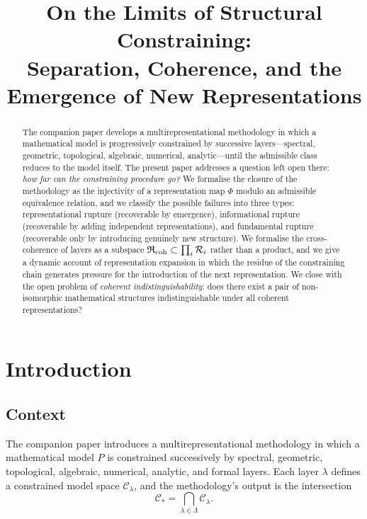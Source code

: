 \documentclass[11pt,a4paper]{article}
\title{%
  \textbf{On the Limits of Structural Constraining:}\\[4pt]
  \large Separation, Coherence, and the Emergence of New Representations
}
\author{}
\date{}
\theoremstyle{definition}
\theoremstyle{plain}
\newcommand{\Lam}{\Lambda}
\newcommand{\Rcal}{\mathcal{R}}
\newcommand{\Ccal}{\mathcal{C}}
\newcommand{\Rfrak}{\mathfrak{R}}
\newcommand{\Phimap}{\Phi}
\begin{document}
\maketitle

\begin{abstract}
\noindent
The companion paper \cite{paperI} develops a
multirepresentational methodology in which a mathematical model is
progressively constrained by successive layers---spectral,
geometric, topological, algebraic, numerical, analytic---until the
admissible class reduces to the model itself. The present paper
addresses a question left open there: \emph{how far can the
constraining procedure go?} We formalise the closure of the
methodology as the injectivity of a representation map $\Phimap$
modulo an admissible equivalence relation, and we classify the
possible failures into three types: representational rupture
(recoverable by emergence), informational rupture (recoverable by
adding independent representations), and fundamental rupture
(recoverable only by introducing genuinely new structure). We
formalise the cross-coherence of layers as a subspace $\Rfrak_{\rm
coh} \subset \prod_i \Rcal_i$ rather than a product, and we give a
dynamic account of representation expansion in which the residue of
the constraining chain generates pressure for the introduction of
the next representation. We close with the open problem of
\emph{coherent indistinguishability}: does there exist a pair of
non-isomorphic mathematical structures indistinguishable under all
coherent representations?
\end{abstract}

\tableofcontents

\section{Introduction}
\label{sec:intro}

\subsection{Context}

The companion paper \cite{paperI} introduces a multirepresentational
methodology in which a mathematical model $P$ is constrained
successively by spectral, geometric, topological, algebraic,
numerical, analytic, and formal layers. Each layer $\lambda$ defines
a constrained model space $\Ccal_\lambda$, and the methodology's
output is the intersection
\[
  \Ccal_\ast = \bigcap_{\lambda \in \Lam} \Ccal_\lambda .
\]
\end{document}
